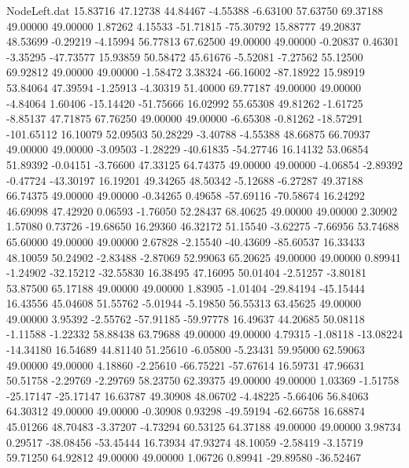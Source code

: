 \begin{filecontents}{NodeLeft.dat}
  15.83716   47.12738   44.84467    -4.55388   -6.63100   57.63750   69.37188   49.00000   49.00000    1.87262    4.15533  -51.71815  -75.30792
  15.88777   49.20837   48.53699    -0.29219   -4.15994   56.77813   67.62500   49.00000   49.00000   -0.20837    0.46301   -3.35295  -47.73577
  15.93859   50.58472   45.61676    -5.52081   -7.27562   55.12500   69.92812   49.00000   49.00000   -1.58472    3.38324  -66.16002  -87.18922
  15.98919   53.84064   47.39594    -1.25913   -4.30319   51.40000   69.77187   49.00000   49.00000   -4.84064    1.60406  -15.14420  -51.75666
  16.02992   55.65308   49.81262    -1.61725   -8.85137   47.71875   67.76250   49.00000   49.00000   -6.65308   -0.81262  -18.57291 -101.65112
  16.10079   52.09503   50.28229    -3.40788   -4.55388   48.66875   66.70937   49.00000   49.00000   -3.09503   -1.28229  -40.61835  -54.27746
  16.14132   53.06854   51.89392    -0.04151   -3.76600   47.33125   64.74375   49.00000   49.00000   -4.06854   -2.89392   -0.47724  -43.30197
  16.19201   49.34265   48.50342    -5.12688   -6.27287   49.37188   66.74375   49.00000   49.00000   -0.34265    0.49658  -57.69116  -70.58674
  16.24292   46.69098   47.42920     0.06593   -1.76050   52.28437   68.40625   49.00000   49.00000    2.30902    1.57080    0.73726  -19.68650
  16.29360   46.32172   51.15540    -3.62275   -7.66956   53.74688   65.60000   49.00000   49.00000    2.67828   -2.15540  -40.43609  -85.60537
  16.33433   48.10059   50.24902    -2.83488   -2.87069   52.99063   65.20625   49.00000   49.00000    0.89941   -1.24902  -32.15212  -32.55830
  16.38495   47.16095   50.01404    -2.51257   -3.80181   53.87500   65.17188   49.00000   49.00000    1.83905   -1.01404  -29.84194  -45.15444
  16.43556   45.04608   51.55762    -5.01944   -5.19850   56.55313   63.45625   49.00000   49.00000    3.95392   -2.55762  -57.91185  -59.97778
  16.49637   44.20685   50.08118    -1.11588   -1.22332   58.88438   63.79688   49.00000   49.00000    4.79315   -1.08118  -13.08224  -14.34180
  16.54689   44.81140   51.25610    -6.05800   -5.23431   59.95000   62.59063   49.00000   49.00000    4.18860   -2.25610  -66.75221  -57.67614
  16.59731   47.96631   50.51758    -2.29769   -2.29769   58.23750   62.39375   49.00000   49.00000    1.03369   -1.51758  -25.17147  -25.17147
  16.63787   49.30908   48.06702    -4.48225   -5.66406   56.84063   64.30312   49.00000   49.00000   -0.30908    0.93298  -49.59194  -62.66758
  16.68874   45.01266   48.70483    -3.37207   -4.73294   60.53125   64.37188   49.00000   49.00000    3.98734    0.29517  -38.08456  -53.45444
  16.73934   47.93274   48.10059    -2.58419   -3.15719   59.71250   64.92812   49.00000   49.00000    1.06726    0.89941  -29.89580  -36.52467

\end{filecontents}
